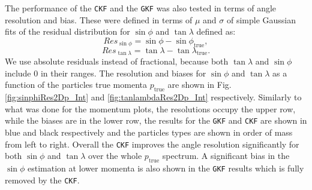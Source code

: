 The performance of the \texttt{CKF} and the \texttt{GKF} was also tested in terms of angle resolution and bias. These were defined in terms of $\mu$ and $\sigma$ of simple Gaussian fits of the residual distribution for $\sin{\phi}$ and $\tan\lambda$ defined as:
\begin{equation}
    Res_{\sin\phi}=\sin\phi-\sin\phi_\textrm{true},
\end{equation}
\begin{equation}
    Res_{\tan\lambda}=\tan\lambda-\tan\lambda_\textrm{true}.
\end{equation}
We use absolute residuals instead of fractional, because both $\tan\lambda$ and $\sin\phi$ include $0$ in their ranges. The resolution and biases for $\sin\phi$ and $\tan\lambda$ as a function of the particles true momenta $p_\textrm{true}$ are shown in Fig. \ref{fig:sinphiRes2Dp_Int} and \ref{fig:tanlambdaRes2Dp_Int} respectively. Similarly to what was done for the momentum plots, the resolutions occupy the upper row, while the biases are in the lower row, the results for the \texttt{GKF} and \texttt{CKF} are shown in blue and black respectively and the particles types are shown in order of mass from left to right. Overall the \texttt{CKF} improves the angle resolution significantly for both $\sin\phi$ and $\tan\lambda$ over the whole $p_\textrm{true}$ spectrum. A significant bias in the $\sin\phi$ estimation at lower momenta is also shown in the \texttt{GKF} results which is fully removed by the \texttt{CKF}.
